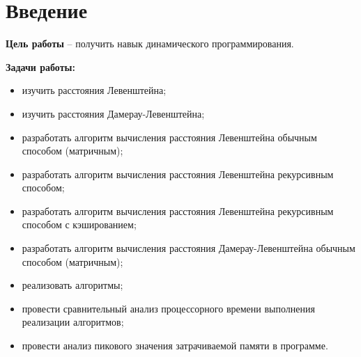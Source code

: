 \chapter*{Введение}
\textbf{Цель работы} – получить навык динамического программирования.

\textbf{Задачи работы:}
\begin{itemize}
	\item изучить расстояния Левенштейна;
	\item изучить расстояния Дамерау-Левенштейна;
	\item разработать алгоритм вычисления расстояния Левенштейна обычным способом (матричным);
	\item разработать алгоритм вычисления расстояния Левенштейна рекурсивным способом;
	\item разработать алгоритм вычисления расстояния Левенштейна рекурсивным способом с кэшированием;
	\item разработать алгоритм вычисления расстояния Дамерау-Левенштейна обычным способом (матричным);
	\item реализовать алгоритмы;
	\item провести сравнительный анализ процессорного времени выполнения реализации алгоритмов;
	\item провести анализ пикового значения затрачиваемой памяти в программе.
\end{itemize}